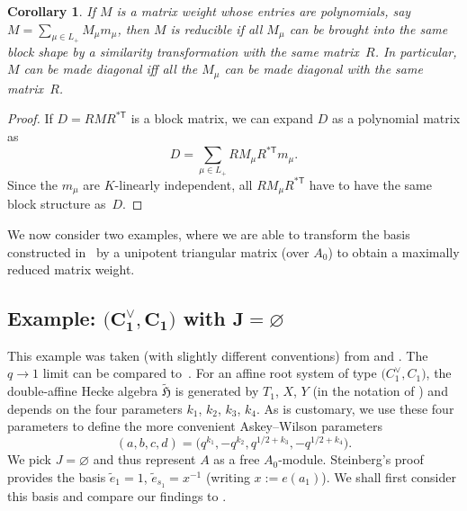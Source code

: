\documentclass[10pt,a4paper]{amsart}
\newtheorem{Corollary}[Theorem]{Corollary}
\theoremstyle{definition}
\numberwithin{equation}{section}
\begin{document}
\begin{Corollary}\label{sec:cor-shi-block-structure}
 If $M$ is a matrix weight whose entries are polynomials,
 say $M= \sum_{\mu\in L_+} M_\mu m_\mu$, then $M$ is reducible if all
 $M_\mu$ can be brought into the same block shape by a similarity transformation
 with the same matrix~$R$.
 In particular, $M$ can be made diagonal iff all the $M_\mu$ can be made diagonal
 with the same matrix~$R$.
\end{Corollary}
\begin{proof}
 If $D=RMR^{*{\mathsf T}}$ is a block matrix, we can expand $D$ as a polynomial matrix as
 \[
 D = \sum_{\mu\in L_+} R M_\mu R^{*{\mathsf T}} m_\mu.
 \]
 Since the $m_\mu$ are $K$-linearly independent, all $R M_\mu R^{*{\mathsf T}}$ have to
 have the same block structure as~$D$.
\end{proof}

We now consider two examples, where we are able to
transform the basis constructed in~\cite{pittieSteinberg} by a
unipotent triangular matrix (over $A_0$) to obtain a maximally reduced
matrix weight.

\subsection[Example: (C\_1\^{}vee, C\_1) with J=varnothing]{Example: $\boldsymbol{\bigl(C_1^\vee, C_1\bigr)}$ with $\boldsymbol{J=\varnothing}$}
This example was taken (with slightly different conventions) from
\cite{koornwinderBouzeffour} and \cite[Section~6]{koornwinderMazzocco}. The~${q\to1}$ limit can be compared to~\cite{mvpBC1}. For
an affine root system of type $\bigl(C_1^\vee, C_1\bigr)$, the double-affine Hecke
algebra $\tilde{\mathfrak{H}}$ is
generated by $T_1$, $X$, $Y$ (in the notation of \cite[Section~6.4]{macdonald}) and depends on the four parameters
$k_1$, $k_2$, $k_3$, $k_4$. As is customary, we use these four parameters to define
the more convenient Askey--Wilson parameters
\[
 (a,b,c,d) = \bigl(q^{k_1},-q^{k_2},q^{1/2+k_3},-q^{1/2+k_4}\bigr).
\]
We pick $J=\varnothing$ and thus represent $A$ as a free $A_0$-module.
Steinberg's proof provides the basis $\tilde{e}_1=1$, $\tilde{e}_{s_1} = x^{-1}$ (writing $x:= e(a_1)$).
We shall first consider this basis and compare our findings to
\cite{mvpBC1}.
\end{document}
